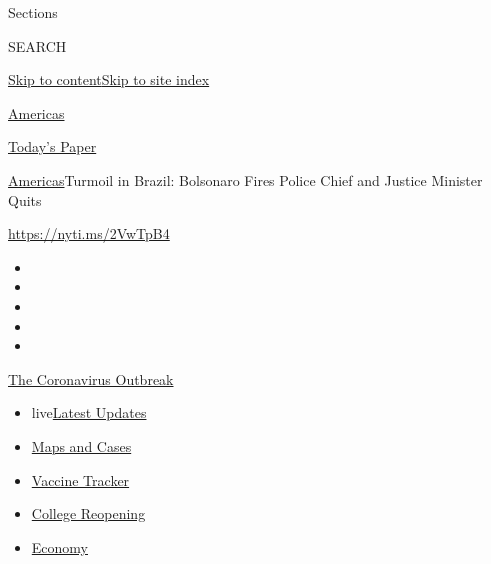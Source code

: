 Sections

SEARCH

\protect\hyperlink{site-content}{Skip to
content}\protect\hyperlink{site-index}{Skip to site index}

\href{https://www.nytimes3xbfgragh.onion/section/world/americas}{Americas}

\href{https://myaccount.nytimes3xbfgragh.onion/auth/login?response_type=cookie\&client_id=vi}{}

\href{https://www.nytimes3xbfgragh.onion/section/todayspaper}{Today's
Paper}

\href{/section/world/americas}{Americas}\textbar{}Turmoil in Brazil:
Bolsonaro Fires Police Chief and Justice Minister Quits

\url{https://nyti.ms/2VwTpB4}

\begin{itemize}
\item
\item
\item
\item
\item
\end{itemize}

\href{https://www.nytimes3xbfgragh.onion/news-event/coronavirus?action=click\&pgtype=Article\&state=default\&region=TOP_BANNER\&context=storylines_menu}{The
Coronavirus Outbreak}

\begin{itemize}
\tightlist
\item
  live\href{https://www.nytimes3xbfgragh.onion/2020/08/04/world/coronavirus-cases.html?action=click\&pgtype=Article\&state=default\&region=TOP_BANNER\&context=storylines_menu}{Latest
  Updates}
\item
  \href{https://www.nytimes3xbfgragh.onion/interactive/2020/us/coronavirus-us-cases.html?action=click\&pgtype=Article\&state=default\&region=TOP_BANNER\&context=storylines_menu}{Maps
  and Cases}
\item
  \href{https://www.nytimes3xbfgragh.onion/interactive/2020/science/coronavirus-vaccine-tracker.html?action=click\&pgtype=Article\&state=default\&region=TOP_BANNER\&context=storylines_menu}{Vaccine
  Tracker}
\item
  \href{https://www.nytimes3xbfgragh.onion/2020/08/02/us/covid-college-reopening.html?action=click\&pgtype=Article\&state=default\&region=TOP_BANNER\&context=storylines_menu}{College
  Reopening}
\item
  \href{https://www.nytimes3xbfgragh.onion/live/2020/08/04/business/stock-market-today-coronavirus?action=click\&pgtype=Article\&state=default\&region=TOP_BANNER\&context=storylines_menu}{Economy}
\end{itemize}

